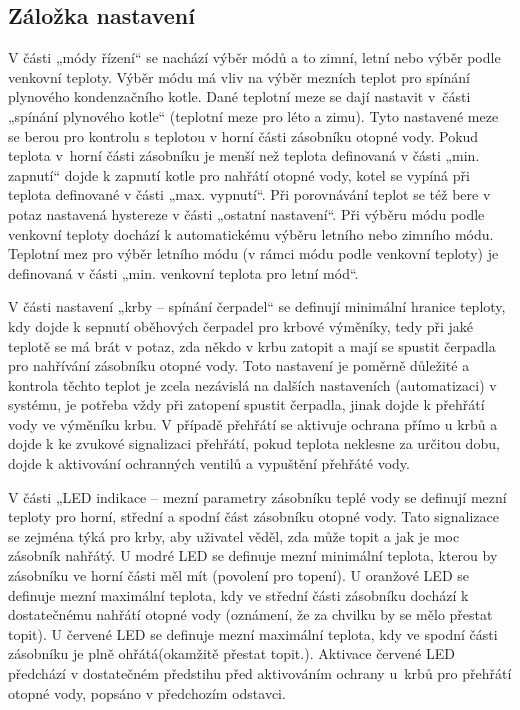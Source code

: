 \subsection{Záložka nastavení}
V části „módy řízení“ se nachází výběr módů a to zimní, letní nebo výběr podle venkovní teploty. Výběr módu má vliv na výběr mezních teplot pro spínání plynového kondenzačního kotle. Dané teplotní meze se dají nastavit v~části „spínání plynového kotle“ (teplotní meze pro léto a zimu). Tyto nastavené meze se berou pro kontrolu s teplotou v horní části zásobníku otopné vody. Pokud teplota v~horní části zásobníku je menší než teplota definovaná v části „min. zapnutí“ dojde k zapnutí kotle pro nahřátí otopné vody, kotel se vypíná při teplota definované v části „max. vypnutí“. Při porovnávání teplot se též bere v potaz nastavená hystereze v části „ostatní nastavení“. Při výběru módu podle venkovní teploty dochází k automatickému výběru letního nebo zimního módu. Teplotní mez pro výběr letního módu (v rámci módu podle venkovní teploty) je definovaná v části „min. venkovní teplota pro letní mód“. 

V části nastavení „krby – spínání čerpadel“ se definují minimální hranice teploty, kdy dojde k sepnutí oběhových čerpadel pro krbové výměníky, tedy při jaké teplotě se má brát v potaz, zda někdo v krbu zatopit a mají se spustit čerpadla pro nahřívání zásobníku otopné vody. Toto nastavení je poměrně důležité a kontrola těchto teplot je zcela nezávislá na dalších nastaveních (automatizaci) v systému, je potřeba vždy při zatopení spustit čerpadla, jinak dojde k přehřátí vody ve výměníku krbu. V případě přehřátí se aktivuje ochrana přímo u krbů a dojde k ke zvukové signalizaci přehřátí, pokud teplota neklesne za určitou dobu, dojde k aktivování ochranných ventilů a vypuštění přehřáté vody.

V části „LED indikace – mezní parametry zásobníku teplé vody se definují mezní teploty pro horní, střední a spodní část zásobníku otopné vody. Tato signalizace se zejména týká pro krby, aby uživatel věděl, zda může topit a jak je moc zásobník nahřátý. U modré LED se definuje mezní minimální teplota, kterou by zásobníku ve horní části měl mít (povolení pro topení). U oranžové LED se definuje mezní maximální teplota, kdy ve střední části zásobníku dochází k dostatečnému nahřátí otopné vody (oznámení, že za chvilku by se mělo přestat topit). U červené LED se definuje mezní maximální teplota, kdy ve spodní části zásobníku je plně ohřátá(okamžitě přestat topit.). Aktivace červené LED předchází v dostatečném předstihu před aktivováním ochrany u~krbů pro přehřátí otopné vody, popsáno v předchozím odstavci.

